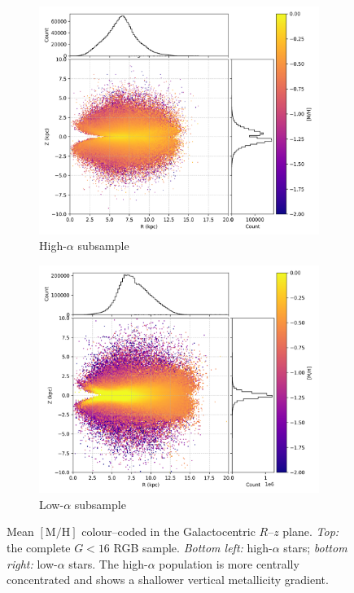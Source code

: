\documentclass[a4paper,12pt]{article}
\begin{document}
\begin{figure}[H]
  \begin{subfigure}{0.45\textwidth}
    \centering
    \includegraphics[width=\textwidth]{../figures/vis_rz_metallicity_high_alpha.png}
    \caption{High-$\alpha$ subsample}
    \label{fig:rz_highalpha}
  \end{subfigure}\hfill
  \begin{subfigure}{0.45\textwidth}
    \centering
    \includegraphics[width=\textwidth]{../figures/vis_rz_metallicity_low_alpha.png}
    \caption{Low-$\alpha$ subsample}
    \label{fig:rz_lowalpha}
  \end{subfigure}

  \caption{Mean $[\mathrm{M/H}]$ colour–coded in the
           Galactocentric $R$–$z$ plane.  
           \textit{Top:} the complete $G<16$ RGB sample.
           \textit{Bottom left:} high-$\alpha$ stars; \textit{bottom right:} low-$\alpha$ stars.
           The high-$\alpha$ population is more centrally concentrated and
           shows a shallower vertical metallicity gradient.}
  \label{fig:rz_metallicity}
\end{figure}
\end{document}
